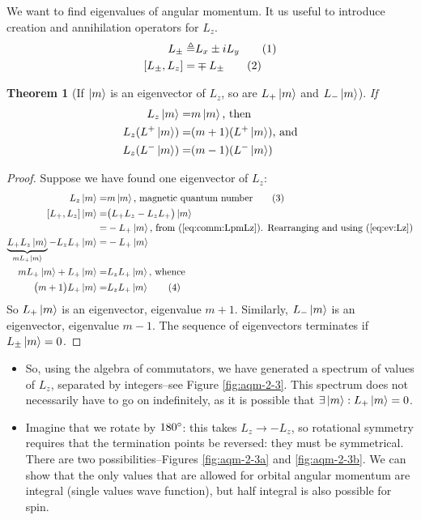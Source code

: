 \documentclass[]{article}
\newcommand\numberthis{\addtocounter{equation}{1}\tag{\theequation}}
\newtheorem{thm}{Theorem}
\begin{document}
We want to find eigenvalues of angular momentum. It us useful to introduce creation and annihilation operators for $L_z$.
\begin{align*}
	L_{\pm} \triangleq& L_x \pm i L_y \numberthis \label{eq:comm:Lpm}\\
	[L_{\pm},L_z] =& \mp L_{\pm} \numberthis \label{eq:comm:LpmLz}
\end{align*}

\begin{thm}[If $\ket{m}$ is an eigenvector of $L_z$, so are $L_+ \ket{m}$ and $L_- \ket{m}$]
	If 
	\begin{align*}
		L_z \ket{m} =& m \ket{m} \text{, then }\\
		L_z (L^+ \ket{m}) =& (m+1) (L^+\ket{m}) \text{, and}\\
		L_z (L^- \ket{m}) =& (m-1) (L^-\ket{m})
	\end{align*}
\end{thm}
\begin{proof}
	Suppose we have found one eigenvector of $L_z$:
	\begin{align*}
		L_z \ket{m} =& m \ket{m} \text{, magnetic quantum number}\numberthis \label{eq:ev:Lz}\\
		[L_+,L_z] \ket{m} =& \big(L_+L_z - L_zL_+\big) \ket{m}\\
		=&- L_+ \ket{m} \text{, from (\ref{eq:comm:LpmLz}). Rearranging  and using (\ref{eq:ev:Lz})}\\
		\underbrace{L_+L_z \ket{m}}_{m L_+\ket{m}} - L_zL_+ \ket{m} =&- L_+ \ket{m}\\
		m L_+\ket{m} + L_+\ket{m} =& L_z L_+ \ket{m} \text{, whence}\\
		\big(m + 1 \big)L_+\ket{m}  =& L_z L_+ \ket{m} \numberthis \label{eq:create_m}
	\end{align*}
	So $L_+ \ket{m}$ is an eigenvector, eigenvalue $m+1$.
	Similarly, $L_- \ket{m}$ is an eigenvector, eigenvalue $m-1$. The sequence of eigenvectors terminates if  $L_{\pm} \ket{m}=0$.
\end{proof}

\begin{itemize}
	\item So, using the algebra of commutators, we have generated a spectrum of values of $L_z$, separated by integers--see Figure \ref{fig:aqm-2-3}. This spectrum does not necessarily have to go on indefinitely, as it is possible that $\exists  \ket{m}: L_+ \ket{m} = 0$.
	\item Imagine that we rotate by $180\degree$: this takes $L_z\rightarrow - L_z$, so rotational symmetry requires that the termination points be reversed: they must be symmetrical. There are two possibilities--Figures \ref{fig:aqm-2-3a} and \ref{fig:aqm-2-3b}. We can show that the only values that are allowed for orbital angular momentum are integral (single values wave function), but half integral is also possible for spin. 
\end{itemize}
\end{document}
